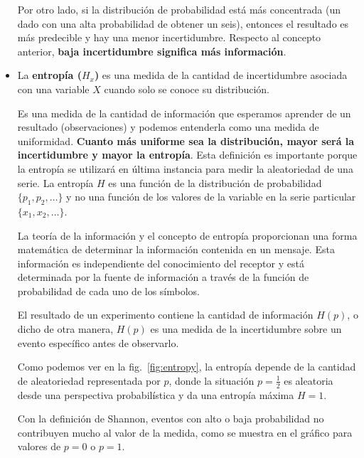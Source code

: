 \documentclass[a4paper,12pt]{article}
\begin{document}
\begin{itemize}[noitemsep, topsep=2pt]
	      Por otro lado, si la distribución de probabilidad está más concentrada (un dado con una alta probabilidad de obtener un seis), entonces el resultado es más predecible y hay una menor incertidumbre. Respecto al concepto anterior, \textbf{baja incertidumbre significa más información}. 
	      	      
	\item La \textbf{entropía ($H_x$)} es una medida de la cantidad de incertidumbre asociada con una variable $X$ cuando solo se conoce su distribución. 
	      	      
	      Es una medida de la cantidad de información que esperamos aprender de un resultado (observaciones) y podemos entenderla como una medida de uniformidad. \textbf{Cuanto más uniforme sea la distribución, mayor será la incertidumbre y mayor la entropía}. Esta definición es importante porque la entropía se utilizará en última instancia para medir la aleatoriedad de una serie. La entropía $H$ es una función de la distribución de probabilidad $\{p_1, p_2, \dots \}$ y no una función de los valores de la variable en la serie particular $\{x_1, x_2, \dots\}$. 
	      	      
	      La teoría de la información y el concepto de entropía proporcionan una forma matemática de determinar la información contenida en un mensaje. Esta información es independiente del conocimiento del receptor y está determinada por la fuente de información a través de la función de probabilidad de cada uno de los símbolos. 
	      	      
	      El resultado de un experimento contiene la cantidad de información $H(p)$, o dicho de otra manera, $H(p)$ es una medida de la incertidumbre sobre un evento específico antes de observarlo.
	      	      
	      Como podemos ver en la fig.~\ref{fig:entropy}, la entropía depende de la cantidad de aleatoriedad representada por $p$, donde la situación $p = \frac{1}{2}$ es aleatoria desde una perspectiva probabilística y da una entropía máxima $H=1$.
	      	      
	      \clearpage
	      	      
	      Con la definición de Shannon, eventos con alto o baja probabilidad no contribuyen mucho al valor de la medida, como se muestra en el gráfico para valores de $p =0$ o $p=1$.
	      	      
\end{itemize}
\end{document}
